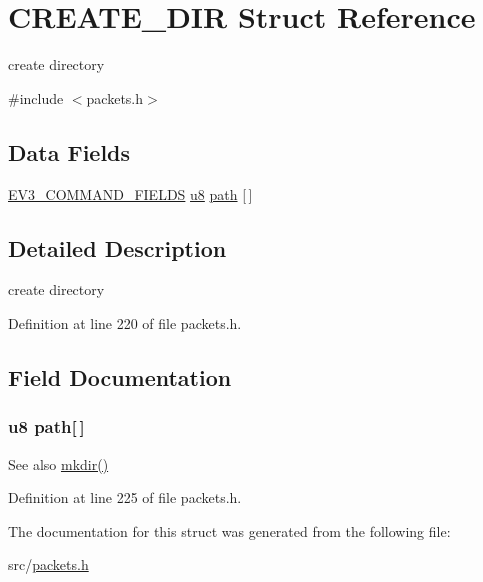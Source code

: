 \hypertarget{struct_c_r_e_a_t_e___d_i_r}{}\section{C\+R\+E\+A\+T\+E\+\_\+\+D\+I\+R Struct Reference}
\label{struct_c_r_e_a_t_e___d_i_r}


create directory  




{\ttfamily \#include $<$packets.\+h$>$}

\subsection*{Data Fields}
\begin{DoxyCompactItemize}
\item 
\hyperlink{packets_8h_a0c26a010ef0da2962a751796943824c9}{E\+V3\+\_\+\+C\+O\+M\+M\+A\+N\+D\+\_\+\+F\+I\+E\+L\+D\+S} \hyperlink{defs_8h_a92c50087ca0e64fa93fc59402c55f8ca}{u8} \hyperlink{struct_c_r_e_a_t_e___d_i_r_a56e505ffa12d1226ba348960c4678d7f}{path} \mbox{[}$\,$\mbox{]}
\end{DoxyCompactItemize}


\subsection{Detailed Description}
create directory 

Definition at line 220 of file packets.\+h.



\subsection{Field Documentation}
\hypertarget{struct_c_r_e_a_t_e___d_i_r_a56e505ffa12d1226ba348960c4678d7f}{}
\subsubsection[{path}]{ {\bf u8} path\mbox{[}$\,$\mbox{]}}\label{struct_c_r_e_a_t_e___d_i_r_a56e505ffa12d1226ba348960c4678d7f}
\begin{DoxySeeAlso}{See also}
\hyperlink{funcs_8h_a433be27a0f3e031bf4b8aca1c53284cb}{mkdir()} 
\end{DoxySeeAlso}


Definition at line 225 of file packets.\+h.



The documentation for this struct was generated from the following file\+:\begin{DoxyCompactItemize}
\item 
src/\hyperlink{packets_8h}{packets.\+h}\end{DoxyCompactItemize}
